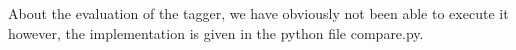 \documentclass[10pt, a4paper, oneside]{article} %
\begin{document}
About the evaluation of the tagger, we have obviously not been able to execute it however, the implementation is given in the python file compare.py. 


\pagestyle{fancy} %

\pagebreak
%
%
%
%
%
%
%
%
%
%
%
%
%
%




%
%
%


%
%
%
%
%
%
%
%
\end{document}
